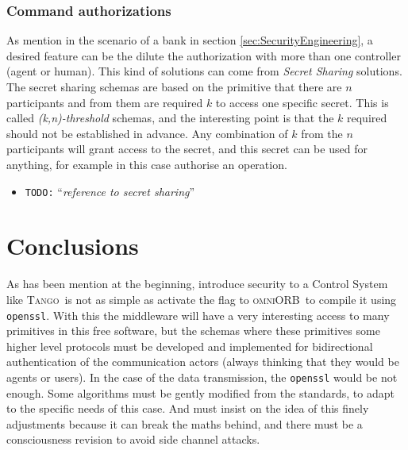 \documentclass[10pt,a4paper,twoside]{llncs}
\newcommand{\todo}[1]{\texttt{\color{red}TODO:} ``\emph{#1}''}
\newcommand{\tango}{\textsc{Tango}}
\newcommand{\omniorb}{\textsc{omniORB}}
\begin{document}
\subsubsection{Command authorizations}\label{sec:secretSharing}

As mention in the scenario of a bank in section \ref{sec:SecurityEngineering}, a desired feature can be the dilute the authorization with more than one controller (agent or human). This kind of solutions can come from \emph{Secret Sharing} solutions. The secret sharing schemas are based on the primitive that there are $n$ participants and from them are required $k$ to access one specific secret. This is called \emph{(k,n)-threshold} schemas, and the interesting point is that the $k$ required should not be established in advance. Any combination of $k$ from the $n$ participants will grant access to the secret, and this secret can be used for anything, for example in this case authorise an operation.

\begin{itemize}
    \item \todo{reference to secret sharing}
\end{itemize}

    
\section{Conclusions}\label{sec:conclusions}


As has been mention at the beginning, introduce security to a Control System like \tango\, is not as simple as activate the flag to \omniorb\, to compile it using {\tt openssl}. With this the middleware will have a very interesting access to many primitives in this free software, but the schemas where these primitives some higher level protocols must be developed and implemented for bidirectional authentication of the communication actors (always thinking that they would be agents or users). In the case of the data transmission, the {\tt openssl} would be not enough. Some algorithms must be gently modified from the standards, to adapt to the specific needs of this case. And must insist on the idea of this finely adjustments because it can break the maths behind, and there must be a consciousness revision to avoid side channel attacks.
\end{document}
